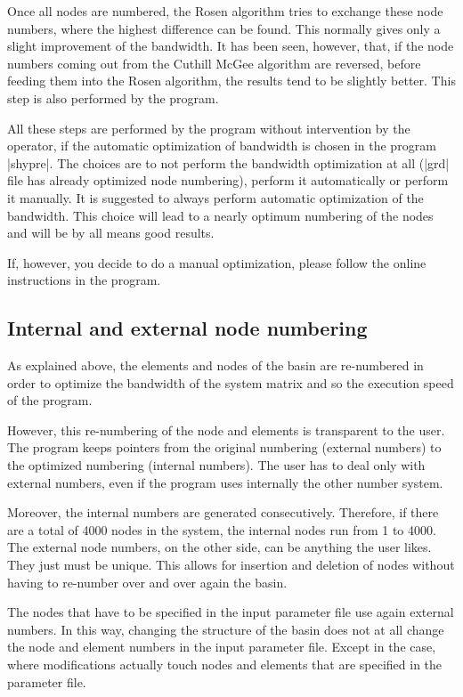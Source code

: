 Once all nodes are numbered, the Rosen algorithm tries to
exchange these node numbers, where the highest difference
can be found. This normally gives only a slight improvement
of the bandwidth. It has been seen, however, that, if the
node numbers coming out from the Cuthill McGee algorithm
are reversed, before feeding them into the Rosen algorithm, 
the results tend to be slightly better. This step is also
performed by the program.

All these steps are performed by the program without
intervention by the operator, if the automatic optimization
of bandwidth is chosen in the program |shypre|. The choices
are to not perform the bandwidth optimization at all
(|grd| file has already optimized node numbering), perform
it automatically or perform it manually. It is suggested
to always perform automatic optimization of the bandwidth.
This choice will lead to a nearly optimum numbering of the
nodes and will be by all means good results.

If, however, you decide to do a manual optimization, please
follow the online instructions in the program.

\subsection{Internal and external node numbering}

As explained above, the elements and nodes of the basin are re-numbered 
in order to optimize the bandwidth of the system matrix and so
the execution speed of the program. 

However, this re-numbering of the node and elements is transparent
to the user. The program keeps pointers from the original numbering
(external numbers) to the optimized numbering (internal numbers).
The user has to deal only with external numbers, even if the 
program uses internally the other number system.

Moreover, the internal numbers are generated consecutively.
Therefore, if there are a total of 4000 nodes in the system, the internal
nodes run from 1 to 4000. The external node numbers,
on the other side, can be anything the user likes. They just must be
unique. This allows for insertion and deletion of nodes without
having to re-number over and over again the basin.

The nodes that have to be specified in the input parameter file
use again external numbers. In this way, changing the structure of
the basin does not at all change the node and element numbers in the
input parameter file. Except in the case, where modifications
actually touch nodes and elements that are specified in the 
parameter file.

